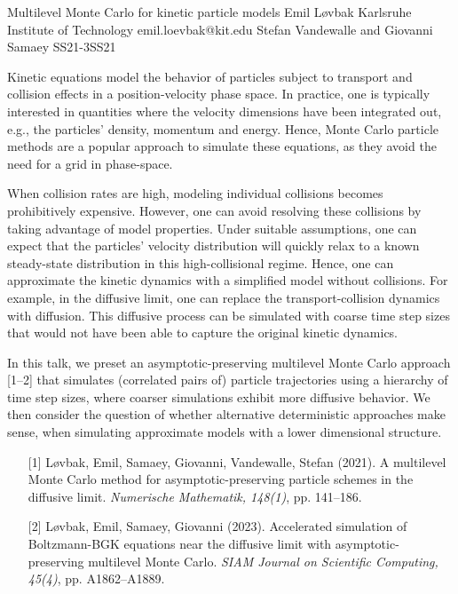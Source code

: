 \begin{talk}
  {Multilevel Monte Carlo for kinetic particle models}%
  {Emil Løvbak}%
  {Karlsruhe Institute of Technology}%
  {emil.loevbak@kit.edu}%
  {Stefan Vandewalle and Giovanni Samaey}%
{}{}{SS21-3}{SS21}

			
Kinetic equations model the behavior of particles subject to transport and collision effects in a position-velocity phase space. In practice, one is typically interested in quantities where the velocity dimensions have been integrated out, e.g., the particles' density, momentum and energy. Hence, Monte Carlo particle methods are a popular approach to simulate these equations, as they avoid the need for a grid in phase-space.

When collision rates are high, modeling individual collisions becomes prohibitively expensive. However, one can avoid resolving these collisions by taking advantage of model properties. Under suitable assumptions, one can expect that the particles' velocity distribution will quickly relax to a known steady-state distribution in this high-collisional regime. Hence, one can approximate the kinetic dynamics with a simplified model without collisions. For example, in the diffusive limit, one can replace the transport-collision dynamics with diffusion. This diffusive process can be simulated with coarse time step sizes that would not have been able to capture the original kinetic dynamics.

In this talk, we preset an asymptotic-preserving multilevel Monte Carlo approach [1--2] that simulates (correlated pairs of) particle trajectories using a hierarchy of time step sizes, where coarser simulations exhibit more diffusive behavior. We then consider the question of whether alternative deterministic approaches make sense, when simulating approximate models with a lower dimensional structure.

\begin{enumerate}
	\item[{[1]}] Løvbak, Emil, Samaey, Giovanni, Vandewalle, Stefan (2021). A multilevel Monte Carlo method for asymptotic-preserving particle schemes in the diffusive limit. \textit{Numerische Mathematik, 148(1)}, pp. 141--186.
	\item[{[2]}] Løvbak, Emil, Samaey, Giovanni (2023). Accelerated simulation of Boltzmann-BGK equations near the diffusive limit with asymptotic-preserving multilevel Monte Carlo. \textit{SIAM Journal on Scientific Computing, 45(4)}, pp. A1862--A1889.
\end{enumerate}

\end{talk}

